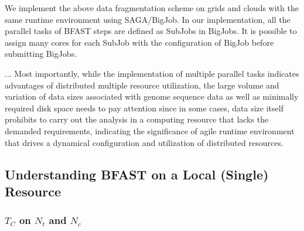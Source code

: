 \documentclass{acm_proc_article-sp}
\begin{document}
We implement the above data fragmentation scheme on grids and clouds with the same runtime environment using SAGA/BigJob\cite{saga-royalsoc,saga-ccgrid10, ecmls10}.  In our implementation, all the parallel tasks of BFAST steps are defined as SubJobs in BigJobs.  It is possible to assign many cores for each SubJob with the configuration of BigJob before submitting BigJobs. 
  
... Most importantly, while the implementation
of multiple parallel tasks indicates advantages of distributed
multiple resource utilization, the large volume and variation of data
sizes associated with genome sequence data as well as minimally
required disk space needs to pay attention since in some cases, data
size itself prohibits to carry out the analysis in a computing
resource that lacks the demanded requirements, indicating the
significance of agile runtime environment that drives a dynamical
configuration and utilization of distributed resources.


\subsection{Understanding BFAST on a Local (Single) Resource}

\subsubsection{$T_{C}$ on $N_t$ and $N_c$}
\end{document}

